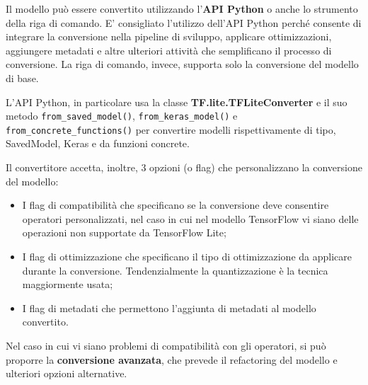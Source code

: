 Il modello può essere convertito utilizzando l’\textbf{API Python} o anche lo strumento della riga di comando. E’ consigliato l’utilizzo dell’API Python perché
consente di integrare la conversione nella pipeline di sviluppo, applicare ottimizzazioni, aggiungere metadati e altre ulteriori attività che
semplificano il processo di conversione. La riga di comando, invece, supporta solo la conversione del modello di base.

L’API Python, in particolare usa la classe \textbf{TF.lite.TFLiteConverter} e il suo metodo \texttt{from\_saved\_model()}, \texttt{from\_keras\_model()} e \texttt{from\_concrete\_functions()}
per convertire modelli rispettivamente di tipo, SavedModel, Keras e da funzioni concrete.

Il convertitore accetta, inoltre, 3 opzioni (o flag) che personalizzano la conversione del modello:
\begin{itemize}
    \item I flag di compatibilità che specificano se la conversione deve consentire operatori personalizzati, nel caso in cui nel modello
    TensorFlow vi siano delle operazioni non supportate da TensorFlow Lite;
    \item I flag di ottimizzazione che specificano il tipo di ottimizzazione da applicare durante la conversione. Tendenzialmente la quantizzazione
    è la tecnica maggiormente usata;
    \item I flag di metadati che permettono l’aggiunta di metadati al modello convertito.
\end{itemize}
Nel caso in cui vi siano problemi di compatibilità con gli operatori, si può proporre la \textbf{conversione avanzata}, che prevede il refactoring del
modello e ulteriori opzioni alternative.

